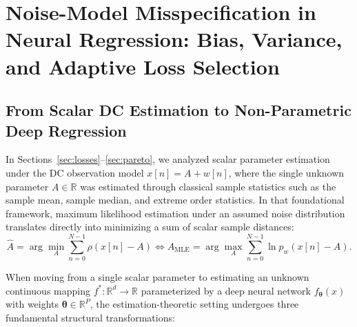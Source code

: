 \providecommand{\euro}{\text{EUR}}

\section{Noise-Model Misspecification in Neural Regression: Bias, Variance, and Adaptive Loss Selection}
\label{sec:neural_misspecification}


\subsection{From Scalar DC Estimation to Non-Parametric Deep Regression}
\label{sec:nn_motivation}

In Sections~\ref{sec:losses}--\ref{sec:pareto}, we analyzed scalar parameter estimation under the DC observation model $x[n] = A + w[n]$, where the single unknown parameter $A \in \mathbb{R}$ was estimated through classical sample statistics such as the sample mean, sample median, and extreme order statistics. In that foundational framework, maximum likelihood estimation under an assumed noise distribution translates directly into minimizing a sum of scalar sample distances:
\begin{equation}
  \hat{A} = \arg\min_A \sum_{n=0}^{N-1} \rho(x[n] - A) \iff \hat{A}_{\text{MLE}} = \arg\max_A \sum_{n=0}^{N-1} \ln p_w(x[n] - A).
\end{equation}

When moving from a single scalar parameter to estimating an unknown continuous mapping $f^*: \mathbb{R}^d \to \mathbb{R}$ parameterized by a deep neural network $f_{\boldsymbol{\theta}}(x)$ with weights $\boldsymbol{\theta} \in \mathbb{R}^P$, the estimation-theoretic setting undergoes three fundamental structural transformations:

